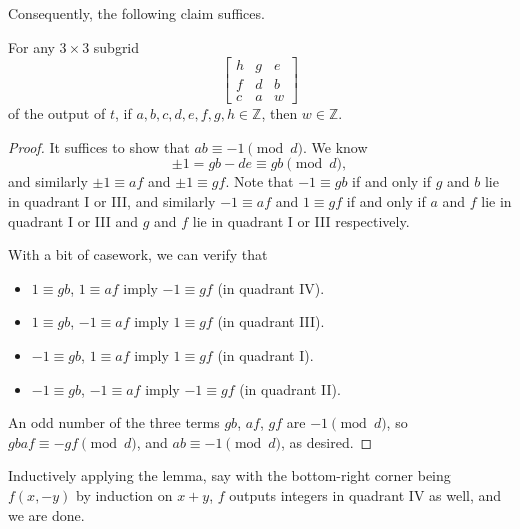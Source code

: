 Consequently, the following claim suffices.
\begin{iclaim*}
    For any $3\times3$ subgrid \[
        \begin{bmatrix}
            h&g&e\\ f&d&b\\ c&a&w
        \end{bmatrix}
    \]
    of the output of $t$, if $a,b,c,d,e,f,g,h\in\mathbb Z$, then $w\in\mathbb Z$.
\end{iclaim*}
\begin{proof}
    It suffices to show that $ab\equiv-1\pmod d$. We know \[\pm1=gb-de\equiv gb\pmod d,\]
    and similarly $\pm1\equiv af$ and $\pm1\equiv gf$. Note that $-1\equiv gb$ if and only if $g$ and $b$ lie in quadrant I or III, and similarly $-1\equiv af$ and $1\equiv gf$ if and only if $a$ and $f$ lie in quadrant I or III and $g$ and $f$ lie in quadrant I or III respectively.

    With a bit of casework, we can verify that
    \begin{itemize}[itemsep=0em]
        \item $1\equiv gb$, $1\equiv af$ imply $-1\equiv gf$ (in quadrant IV).
        \item $1\equiv gb$, $-1\equiv af$ imply $1\equiv gf$ (in quadrant III).
        \item $-1\equiv gb$, $1\equiv af$ imply $1\equiv gf$ (in quadrant I).
        \item $-1\equiv gb$, $-1\equiv af$ imply $-1\equiv gf$ (in quadrant II).
    \end{itemize}
    An odd number of the three terms $gb$, $af$, $gf$ are $-1\pmod d$, so $gbaf\equiv-gf\pmod d$, and $ab\equiv-1\pmod d$, as desired.
\end{proof}

Inductively applying the lemma, say with the bottom-right corner being $f(x,-y)$ by induction on $x+y$, $f$ outputs integers in quadrant IV as well, and we are done.

